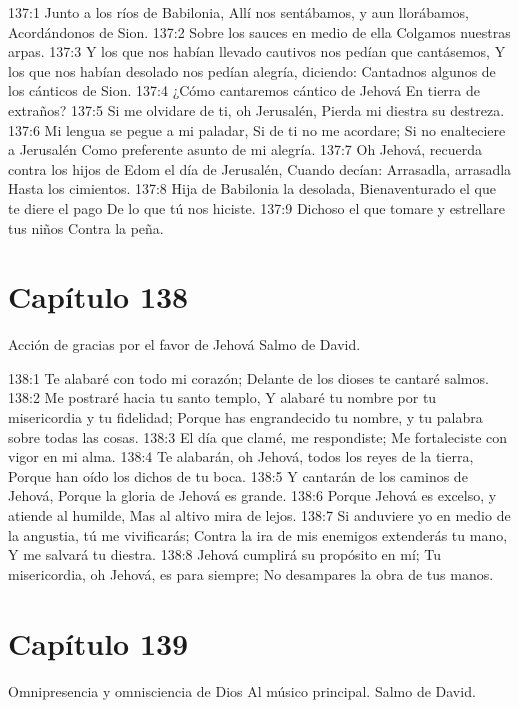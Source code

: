 137:1 Junto a los ríos de Babilonia, 
Allí nos sentábamos, y aun llorábamos, 
Acordándonos de Sion. 
137:2 Sobre los sauces en medio de ella 
Colgamos nuestras arpas. 
137:3 Y los que nos habían llevado cautivos nos pedían que cantásemos, 
Y los que nos habían desolado nos pedían alegría, diciendo: 
Cantadnos algunos de los cánticos de Sion. 
137:4 ¿Cómo cantaremos cántico de Jehová 
En tierra de extraños? 
137:5 Si me olvidare de ti, oh Jerusalén, 
Pierda mi diestra su destreza. 
137:6 Mi lengua se pegue a mi paladar, 
Si de ti no me acordare; 
Si no enalteciere a Jerusalén 
Como preferente asunto de mi alegría. 
137:7 Oh Jehová, recuerda contra los hijos de Edom el día de Jerusalén, 
Cuando decían: Arrasadla, arrasadla 
Hasta los cimientos. 
137:8 Hija de Babilonia la desolada, 
Bienaventurado el que te diere el pago 
De lo que tú nos hiciste. 
137:9 Dichoso el que tomare y estrellare tus niños 
Contra la peña. 
\section*{Capítulo 138}
Acción de gracias por el favor de Jehová 
Salmo de David. 
 
138:1 Te alabaré con todo mi corazón; 
Delante de los dioses te cantaré salmos. 
138:2 Me postraré hacia tu santo templo, 
Y alabaré tu nombre por tu misericordia y tu fidelidad; 
Porque has engrandecido tu nombre, y tu palabra sobre todas las cosas. 
138:3 El día que clamé, me respondiste; 
Me fortaleciste con vigor en mi alma. 
138:4 Te alabarán, oh Jehová, todos los reyes de la tierra, 
Porque han oído los dichos de tu boca. 
138:5 Y cantarán de los caminos de Jehová, 
Porque la gloria de Jehová es grande. 
138:6 Porque Jehová es excelso, y atiende al humilde, 
Mas al altivo mira de lejos. 
138:7 Si anduviere yo en medio de la angustia, tú me vivificarás; 
Contra la ira de mis enemigos extenderás tu mano, 
Y me salvará tu diestra. 
138:8 Jehová cumplirá su propósito en mí; 
Tu misericordia, oh Jehová, es para siempre; 
No desampares la obra de tus manos. 
\section*{Capítulo 139}
Omnipresencia y omnisciencia de Dios 
Al músico principal. Salmo de David. 
 
